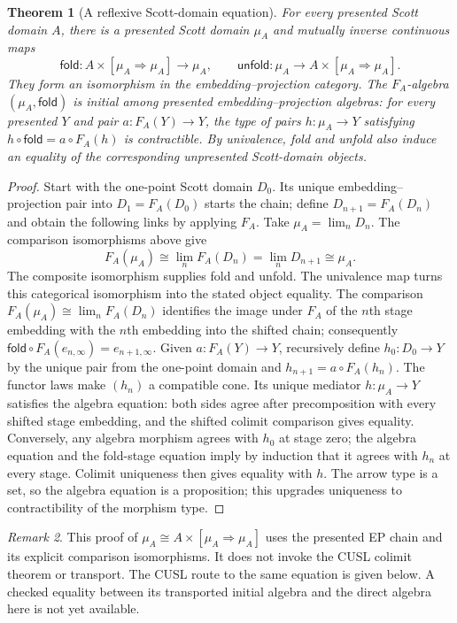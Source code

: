 \documentclass[11pt,a4paper]{article}
\newtheorem{theorem}{Theorem}[section]
\theoremstyle{definition}
\theoremstyle{remark}
\newtheorem{remark}[theorem]{Remark}
\newcommand{\Cont}[2]{[#1\mathbin{\Rightarrow}#2]}
\begin{document}
\begin{theorem}[A reflexive Scott-domain equation]\label{thm:reflexive}
For every presented Scott domain $A$, there is a presented Scott domain
$\mu_A$ and mutually inverse continuous maps
\[
 \mathsf{fold}:A\times\Cont{\mu_A}{\mu_A}\longrightarrow\mu_A,
 \qquad
 \mathsf{unfold}:\mu_A\longrightarrow A\times\Cont{\mu_A}{\mu_A}.
\]
They form an isomorphism in the embedding--projection category. The
$F_A$-algebra $(\mu_A,\mathsf{fold})$ is initial among presented
embedding--projection algebras: for every presented $Y$ and pair
$a:F_A(Y)\to Y$, the type of pairs $h:\mu_A\to Y$ satisfying
$h\circ\mathsf{fold}=a\circ F_A(h)$ is contractible. By univalence,
fold and unfold also induce an equality of the corresponding unpresented
Scott-domain objects.
\end{theorem}
\begin{proof}
Start with the one-point Scott domain $D_0$. Its unique
embedding--projection pair into $D_1=F_A(D_0)$ starts the chain; define
$D_{n+1}=F_A(D_n)$ and obtain the following links by applying $F_A$.
Take $\mu_A=\lim_n D_n$. The comparison isomorphisms above give
\[
 F_A(\mu_A)
 \cong\lim_n F_A(D_n)
 =\lim_n D_{n+1}
 \cong\mu_A.
\]
The composite isomorphism supplies fold and unfold. The univalence map
turns this categorical isomorphism into the stated object equality.
The comparison $F_A(\mu_A)\cong\lim_n F_A(D_n)$ identifies the
image under $F_A$ of the $n$th stage embedding with the $n$th embedding
into the shifted chain; consequently
$\mathsf{fold}\circ F_A(e_{n,\infty})=e_{n+1,\infty}$.
Given $a:F_A(Y)\to Y$, recursively define
$h_0:D_0\to Y$ by the unique pair from the one-point domain and
$h_{n+1}=a\circ F_A(h_n)$. The functor laws make $(h_n)$ a compatible cone.
Its unique mediator $h:\mu_A\to Y$ satisfies the algebra equation:
both sides agree after precomposition with every shifted stage embedding,
and the shifted colimit comparison gives equality. Conversely, any
algebra morphism agrees with $h_0$ at stage zero; the algebra equation
and the fold-stage equation imply by induction that it agrees with
$h_n$ at every stage. Colimit uniqueness then gives equality with $h$.
The arrow type is a set, so the algebra equation is a proposition; this
upgrades uniqueness to contractibility of the morphism type.
\end{proof}

\begin{remark}
This proof of $\mu_A\cong A\times\Cont{\mu_A}{\mu_A}$ uses the presented
EP chain and its explicit comparison isomorphisms. It does not invoke the
CUSL colimit theorem or transport. The CUSL route to the same equation is
given below. A checked equality between its transported initial algebra
and the direct algebra here is not yet available.
\end{remark}
\end{document}
